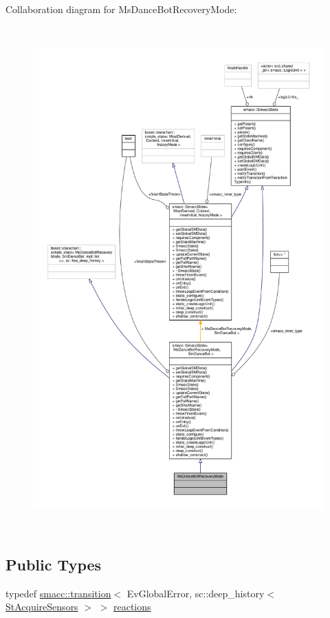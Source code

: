 Collaboration diagram for Ms\+Dance\+Bot\+Recovery\+Mode\+:
\nopagebreak
\begin{figure}[H]
\begin{center}
\leavevmode
\includegraphics[height=550pt]{classMsDanceBotRecoveryMode__coll__graph}
\end{center}
\end{figure}
\subsection*{Public Types}
\begin{DoxyCompactItemize}
\item 
typedef \hyperlink{classsmacc_1_1transition}{smacc\+::transition}$<$ Ev\+Global\+Error, sc\+::deep\+\_\+history$<$ \hyperlink{structStAcquireSensors}{St\+Acquire\+Sensors} $>$ $>$ \hyperlink{classMsDanceBotRecoveryMode_a0b9b9dd300d70cafd84b25b485370b78}{reactions}
\end{DoxyCompactItemize}
